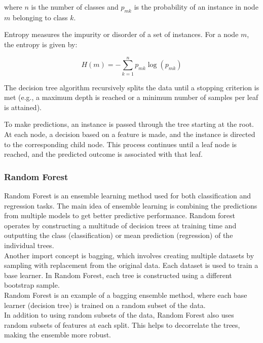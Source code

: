 where \(n\) is the number of classes and \(p_{mk}\) is the probability of an instance in node \(m\) belonging to class \(k\).

Entropy measures the impurity or disorder of a set of instances. For a node \(m\), the entropy is given by:

\begin{equation}
    H(m) = -\sum_{k=1}^{n} p_{mk} \log(p_{mk})
\end{equation}

The decision tree algorithm recursively splits the data until a stopping criterion is met (e.g., a maximum depth is reached or a minimum number of samples per leaf is attained).

To make predictions, an instance is passed through the tree starting at the root. At each node, a decision based on a feature is made, and the instance is directed to the corresponding child node. This process continues until a leaf node is reached, and the predicted outcome is associated with that leaf.

\subsubsection{Random Forest}

Random Forest is an ensemble learning method used for both classification and regression tasks. The main idea of ensemble learning is combining the predictions from multiple models to get better predictive performance. Random forest operates by constructing a multitude of decision trees at training time and outputting the class (classification) or mean prediction (regression) of the individual trees.\\

Another import concept is bagging, which involves creating multiple datasets by sampling with replacement from the original data. Each dataset is used to train a base learner. In Random Forest, each tree is constructed using a different bootstrap sample.\\

 Random Forest is an example of a bagging ensemble method, where each base learner (decision tree) is trained on a random subset of the data.\\


In addition to using random subsets of the data, Random Forest also uses random subsets of features at each split. This helps to decorrelate the trees, making the ensemble more robust.\\

